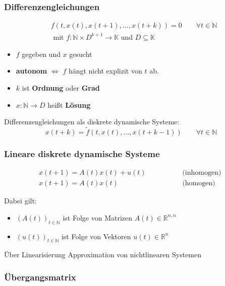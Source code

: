 \documentclass[a4paper]{article}
\newcommand{\R}{\mathbb{R}}
\newcommand{\N}{\mathbb{N}}
\begin{document}
\subsubsection{Differenzengleichungen}


\begin{align*}
	& f(t, x(t), x(t+1), ..., x(t+k)) = 0 \qquad
	\forall t \in \mathbb{N} \\
	& \text{ mit } f: \N \times D^{k+1} \rightarrow \mathbb{K}
	\text{ und } D \subseteq \mathbb{K}
\end{align*}

\begin{itemize}
	\item $f$ gegeben und $x$ gesucht
	\item \textbf{autonom} $\Leftrightarrow$ 
		$f$ hängt nicht explizit von $t$ ab.
	\item $k$ ist \textbf{Ordnung} oder \textbf{Grad} 
	\item $x: \N \rightarrow D$ heißt \textbf{Lösung}
\end{itemize}

Differenzengleichungen als diskrete dynamische Systeme:
\[
	x(t+k) = \tilde{f} \left(
		t, x(t), ..., x(t+k-1)
	\right) \qquad
	\forall t \in \mathbb{N} 
\] 

\subsubsection{Lineare diskrete dynamische Systeme}

\begin{align*}
	x(t+1) = A(t) x(t) + u(t)
	\qquad \qquad & \text{ (inhomogen) } \\
	x(t+1) = A(t) x(t)
	\qquad \qquad & \text{ (homogen) }
\end{align*}

Dabei gilt:

\begin{itemize}
	\item $(A(t))_{t \in \mathbb{N}}$
		ist Folge von Matrizen $A(t) \in \R ^{n, n}$
	\item $(u(t))_{t \in \mathbb{N}}$ ist Folge von Vektoren 
		$u(t) \in \R ^{n}$
\end{itemize}

Über Linearisierung Approximation von nichtlinearen Systemen
\\

\subsubsection{Übergangsmatrix}
\end{document}
